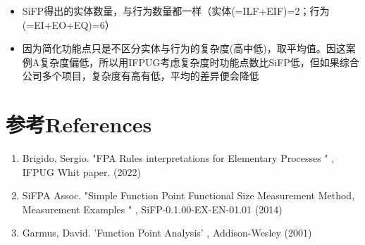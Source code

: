 \documentclass{book}        %
\providecommand{\tightlist}{%
  \setlength{\itemsep}{0pt}\setlength{\parskip}{0pt}}
\begin{document}
\begin{itemize}
\tightlist
\item
  SiFP得出的实体数量，与行为数量都一样（实体(=ILF+EIF)=2；行为(=EI+EO+EQ)=6）
\item
  因为简化功能点只是不区分实体与行为的复杂度(高中低)，取平均值。因这案例A复杂度偏低，所以用IFPUG考虑复杂度时功能点数比SiFP低，但如果综合公司多个项目，复杂度有高有低，平均的差异便会降低
\end{itemize}

\hypertarget{ux53c2ux8003references}{%
\section{参考References}\label{ux53c2ux8003references}}

\begin{enumerate}
\tightlist
\item
  Brigido, Sergio. "FPA Rules interpretations for Elementary Processes "
  , IFPUG Whit paper. (2022)\\
\item
  SiFPA Assoc. "Simple Function Point Functional Size Measurement
  Method, Measurement Examples " , SiFP-0.1.00-EX-EN-01.01 (2014)\\
\item
  Garmus, David. 'Function Point Analysis' , Addison-Wesley (2001)
\end{enumerate}
\end{document}
